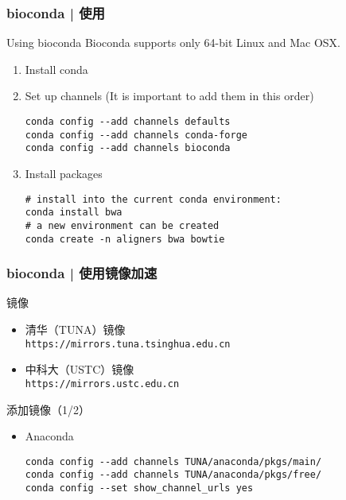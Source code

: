 \begin{frame}[fragile]
  \frametitle{bioconda | 使用}
  \begin{block}{Using bioconda}
    Bioconda supports only 64-bit Linux and Mac OSX.
    \begin{enumerate}
      \item Install conda
      \item Set up channels (It is important to add them in this order)
\vspace{-0.5em}
\begin{lstlisting}
conda config --add channels defaults
conda config --add channels conda-forge
conda config --add channels bioconda
\end{lstlisting}
\vspace{-0.8em}
      \item Install packages
\vspace{-0.5em}
\begin{lstlisting}
# install into the current conda environment:
conda install bwa
# a new environment can be created
conda create -n aligners bwa bowtie
\end{lstlisting}
    \end{enumerate}
  \end{block}
\end{frame}

\begin{frame}[fragile]
  \frametitle{bioconda | 使用镜像加速}
  \begin{block}{镜像}
    \begin{itemize}
      \item 清华（TUNA）镜像\\ \verb|https://mirrors.tuna.tsinghua.edu.cn|
      \item 中科大（USTC）镜像\\ \verb|https://mirrors.ustc.edu.cn|
    \end{itemize}
  \end{block}
  \pause
  \begin{block}{添加镜像（1/2）}
    \begin{itemize}
      \item Anaconda
\begin{lstlisting}
conda config --add channels TUNA/anaconda/pkgs/main/
conda config --add channels TUNA/anaconda/pkgs/free/
conda config --set show_channel_urls yes
\end{lstlisting}
    \end{itemize}
  \end{block}
\end{frame}

